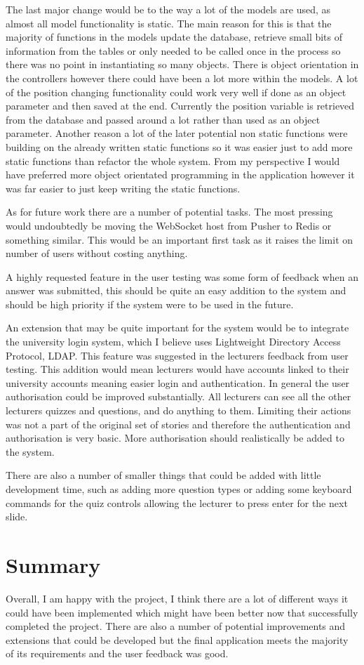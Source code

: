 The last major change would be to the way a lot of the models are used, as almost all model functionality is static. The main reason for this is that the majority of functions in the models update the database, retrieve small bits of information from the tables or only needed to be called once in the process so there was no point in instantiating so many objects. There is object orientation in the controllers however there could have been a lot more within the models. A lot of the position changing functionality could work very well if done as an object parameter and then saved at the end. Currently the position variable is retrieved from the database and passed around a lot rather than used as an object parameter. Another reason a lot of the later potential non static functions were building on the already written static functions so it was easier just to add more static functions than refactor the whole system. From my perspective I would have preferred more object orientated programming in the application however it was far easier to just keep writing the static functions.

As for future work there are a number of potential tasks. The most pressing would undoubtedly be moving the WebSocket host from Pusher to Redis or something similar. This would be an important first task as it raises the limit on number of users without costing anything. 

A highly requested feature in the user testing was some form of feedback when an answer was submitted, this should be quite an easy addition to the system and should be high priority if the system were to be used in the future.

An extension that may be quite important for the system would be to integrate the university login system, which I believe uses Lightweight Directory Access Protocol, LDAP. This feature was suggested in the lecturers feedback from user testing. This addition would mean lecturers would have accounts linked to their university accounts meaning easier login and authentication. In general the user authorisation could be improved substantially. All lecturers can see all the other lecturers quizzes and questions, and do anything to them. Limiting their actions was not a part of the original set of stories and therefore the authentication and authorisation is very basic. More authorisation should realistically be added to the system.

There are also a number of smaller things that could be added with little development time, such as adding more question types or adding some keyboard commands for the quiz controls allowing the lecturer to press enter for the next slide.

\section{Summary}
Overall, I am happy with the project, I think there are a lot of different ways it could have been implemented which might have been better now that successfully completed the project. There are also a number of potential improvements and extensions that could be developed but the final application meets the majority of its requirements and the user feedback was good.